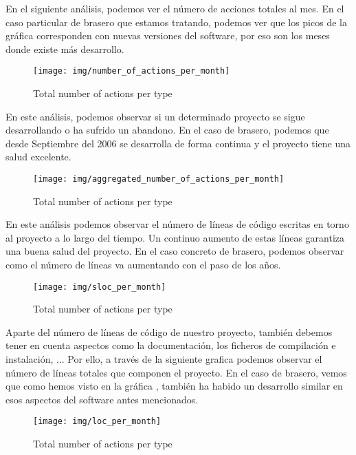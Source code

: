 \newpage
\thispagestyle{empty}
 En el siguiente an\'alisis, podemos ver el n\'umero de acciones totales al mes. En el caso particular de brasero que estamos tratando, podemos ver que los picos de la gr\'afica corresponden con nuevas versiones del software, por eso son los meses donde existe m\'as desarrollo.

\begin{figure}
  \centering
    \texttt{[image: img/number\_of\_actions\_per\_month]}
  \caption{Total number of actions per type}
\end{figure}

\newpage
\thispagestyle{empty}
 En este an\'alisis, podemos observar si un determinado proyecto se sigue desarrollando o ha sufrido un abandono. En el caso de brasero, podemos que desde Septiembre del 2006 se desarrolla de forma continua y el proyecto tiene una salud excelente.

\begin{figure}
  \centering
    \texttt{[image: img/aggregated\_number\_of\_actions\_per\_month]}
  \caption{Total number of actions per type}
\end{figure}

\newpage
\thispagestyle{empty}
 En este an\'alisis podemos observar el n\'umero de l\'ineas de c\'odigo escritas en torno al proyecto a lo largo del tiempo. Un continuo aumento de estas l\'ineas garantiza una buena salud del proyecto. En el caso concreto de brasero, podemos observar como el n\'umero de l\'ineas va aumentando con el paso de los años.

\begin{figure}
  \centering
    \texttt{[image: img/sloc\_per\_month]}
  \caption{Total number of actions per type}
\end{figure}

\newpage
\thispagestyle{empty}
 Aparte del n\'umero de l\'ineas de c\'odigo de nuestro proyecto, tambi\'en debemos tener en cuenta aspectos como la documentaci\'on, los ficheros de compilaci\'on e instalaci\'on, ... Por ello, a trav\'es de la siguiente grafica podemos observar el n\'umero de l\'ineas totales que componen el proyecto. En el caso de brasero, vemos que como hemos visto en la gr\'afica , tambi\'en ha habido un desarrollo similar en esos aspectos del software antes mencionados.

\begin{figure}
  \centering
    \texttt{[image: img/loc\_per\_month]}
  \caption{Total number of actions per type}
\end{figure}

